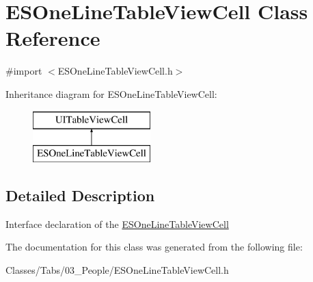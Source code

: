\hypertarget{interface_e_s_one_line_table_view_cell}{}\section{E\+S\+One\+Line\+Table\+View\+Cell Class Reference}
\label{interface_e_s_one_line_table_view_cell}


{\ttfamily \#import $<$E\+S\+One\+Line\+Table\+View\+Cell.\+h$>$}

Inheritance diagram for E\+S\+One\+Line\+Table\+View\+Cell\+:\begin{figure}[H]
\begin{center}
\leavevmode
\includegraphics[height=2.000000cm]{interface_e_s_one_line_table_view_cell}
\end{center}
\end{figure}


\subsection{Detailed Description}
Interface declaration of the \hyperlink{interface_e_s_one_line_table_view_cell}{E\+S\+One\+Line\+Table\+View\+Cell} 

The documentation for this class was generated from the following file\+:\begin{DoxyCompactItemize}
\item 
Classes/\+Tabs/03\+\_\+\+People/E\+S\+One\+Line\+Table\+View\+Cell.\+h\end{DoxyCompactItemize}

